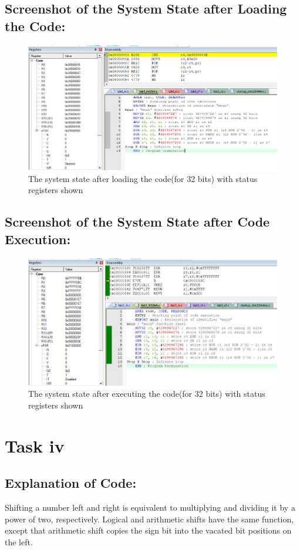 \documentclass[12pt]{article}
\begin{document}
\subsection{Screenshot of the System State after Loading the Code:}
\begin{figure}[ht]
    \centering
    \includegraphics[scale=.7]{images/lab3_1_ss3.jpg}
    \caption{The system state after loading the code(for 32 bits) with status registers shown}
    \label{fig:before_task_three_two}
\end{figure}
\pagebreak
\subsection{Screenshot of the System State after Code Execution:}
\begin{figure}[ht]
    \centering
    \includegraphics[scale=.7]{images/lab3_1_ss4.jpg}
    \caption{The system state after executing the code(for 32 bits) with status registers shown}
    \label{fig:after_task_three_two}
\end{figure}
\pagebreak
\section{Task iv}
\subsection{Explanation of Code:}
Shifting a number left and right is equivalent to multiplying and dividing it by a power of two, respectively. Logical and arithmetic shifts have the same function, except that arithmetic shift copies the sign bit into the vacated bit positions on the left.
\end{document}
